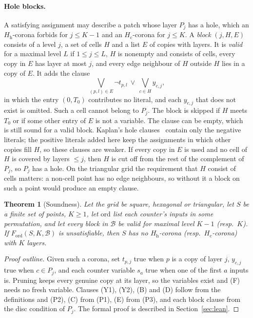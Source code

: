 \documentclass[10pt,a4paper]{article}
\newtheorem{theorem}{Theorem}
\theoremstyle{definition}
\theoremstyle{remark}
\newcommand{\Hc}{H_{\mathrm c}}
\newcommand{\Hh}{H_{\mathrm h}}
\begin{document}
\paragraph{Hole blocks.}
A satisfying assignment may describe a patch whose layer $P_j$ has a
hole, which an $\Hh$-corona forbids for $j\leq K-1$ and an $\Hc$-corona
for $j\leq K$. A \emph{block} $(j,H,E)$ consists of a level $j$, a set of
cells $H$ and a list $E$ of copies with layers. It is \emph{valid} for a
maximal level $L$ if $1\leq j\leq L$, $H$ is nonempty and consists of
cells, every copy in $E$ has layer at most $j$, and every edge neighbour
of $H$ outside $H$ lies in a copy of $E$. It adds the clause
\[
\textstyle\bigvee_{(p,l)\in E}\neg t_{p,l}\ \vee\ \bigvee_{c\in H}y_{c,j},
\]
in which the entry $(0,T_0)$ contributes no literal, and each
$y_{c,j}$ that does not exist is omitted. Such a cell cannot belong to
$P_j$. The block is skipped if $H$ meets $T_0$ or if some other entry of
$E$ is not a variable. The clause can be empty, which is still sound for
a valid block.
Kaplan's hole clauses~\cite[Section~3.2]{Kaplan} contain only the
negative literals; the positive literals added here keep the
assignments in which other copies fill $H$, so these clauses are weaker.
If every copy in $E$ is used and no cell of $H$ is covered by layers
$\leq j$, then $H$ is cut off from the rest of the complement of $P_j$,
so $P_j$ has a hole. On the triangular grid the requirement that $H$
consist of cells matters: a non-cell point has no edge neighbours, so
without it a block on such a point would produce an empty clause.

\begin{theorem}[Soundness]
\label{thm:sound}
Let the grid be square, hexagonal or triangular, let $S$ be a finite set
of points, $K\geq1$, let $\mathrm{ord}$ list each counter's inputs in some
permutation, and let every block in $\mathcal B$ be valid for maximal
level $K-1$ \textup{(}resp.\ $K$\textup{)}. If
$F_{\mathrm{ord}}(S,K,\mathcal B)$ is unsatisfiable, then $S$ has no
$\Hh$-corona \textup{(}resp.\ $\Hc$-corona\textup{)} with $K$ layers.
\end{theorem}
\begin{proof}[Proof outline]
Given such a corona, set $t_{p,j}$ true when $p$ is a copy of layer $j$,
$y_{c,j}$ true when $c\in P_j$, and each counter variable $s_a$ true when
one of the first $a$ inputs is. Pruning keeps every genuine copy at its
layer, so the variables exist and (F) needs no fresh variable. Clauses
(Y1), (Y2), (B) and (D) follow from the definitions and (P2), (C) from
(P1), (E) from (P3), and each block clause from the disc condition of
$P_j$. The formal proof is described in Section~\ref{sec:lean}.
\end{proof}
\end{document}
